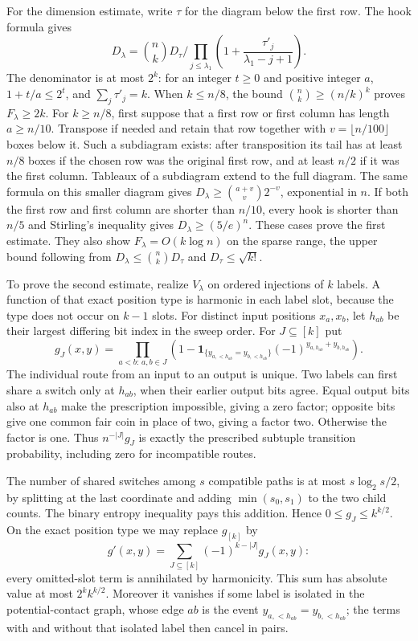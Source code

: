 For the dimension estimate, write $\tau$ for the diagram below the first
row.  The hook formula gives
\[
 D_\lambda=\binom nkD_\tau
 \bigg/\prod_{j\le\lambda_1}
       \left(1+\frac{\tau'_j}{\lambda_1-j+1}\right).
\]
The denominator is at most $2^k$: for an integer $t\ge0$ and
positive integer $a$, $1+t/a\le2^t$, and
$\sum_j\tau'_j=k$.  When $k\le n/8$, the bound
$\binom nk\ge(n/k)^k$ proves $F_\lambda\ge2k$.
For $k\ge n/8$, first suppose that a first row or first column has
length $a\ge n/10$.  Transpose if needed and retain that row together
with $v=\lfloor n/100\rfloor$ boxes below it.  Such a subdiagram
exists: after transposition its tail has at least $n/8$ boxes if the
chosen row was the original first row, and at least $n/2$ if it was
the first column.  Tableaux of a subdiagram extend to the full diagram.
The same formula on this smaller diagram gives
$D_\lambda\ge\binom{a+v}{v}2^{-v}$, exponential in $n$.
If both the first row and first column are shorter than $n/10$, every
hook is shorter than $n/5$ and Stirling's inequality gives
$D_\lambda\ge(5/e)^n$.  These cases prove the first estimate.
They also show $F_\lambda=O(k\log n)$ on the sparse range, the
upper bound following from $D_\lambda\le\binom nkD_\tau$ and
$D_\tau\le\sqrt{k!}$.

To prove the second estimate, realize $V_\lambda$ on ordered injections
of $k$ labels.  A function of that exact position type is harmonic in
each label slot, because the type does not occur on $k-1$ slots.
For distinct input positions $x_a,x_b$, let $h_{ab}$ be their largest
differing bit index in the sweep order.  For $J\subseteq[k]$ put
\[
 g_J(x,y)=\prod_{a<b:\,a,b\in J}
 \left(1-\mathbf1_{\{y_{a,<h_{ab}}=y_{b,<h_{ab}}\}}
                (-1)^{y_{a,h_{ab}}+y_{b,h_{ab}}}\right).
\]
The individual route from an input to an output is unique.  Two labels
can first share a switch only at $h_{ab}$, when their earlier output
bits agree.  Equal output bits also at $h_{ab}$ make the prescription
impossible, giving a zero factor; opposite bits give one common fair
coin in place of two, giving a factor two.  Otherwise the factor is one.
Thus $n^{-|J|}g_J$ is exactly the prescribed subtuple transition
probability, including zero for incompatible routes.

The number of shared switches among $s$ compatible paths is at most
$s\log_2s/2$, by splitting at the last coordinate and adding
$\min(s_0,s_1)$ to the two child counts.  The binary entropy inequality
pays this addition.  Hence $0\le g_J\le k^{k/2}$.
On the exact position type we may replace $g_{[k]}$ by
\[
 g'(x,y)=\sum_{J\subseteq[k]}(-1)^{k-|J|}g_J(x,y):
\]
every omitted-slot term is annihilated by harmonicity.  This sum has
absolute value at most $2^kk^{k/2}$.  Moreover it vanishes if some
label is isolated in the potential-contact graph, whose edge $ab$ is
the event $y_{a,<h_{ab}}=y_{b,<h_{ab}}$; the terms with and without
that isolated label then cancel in pairs.

